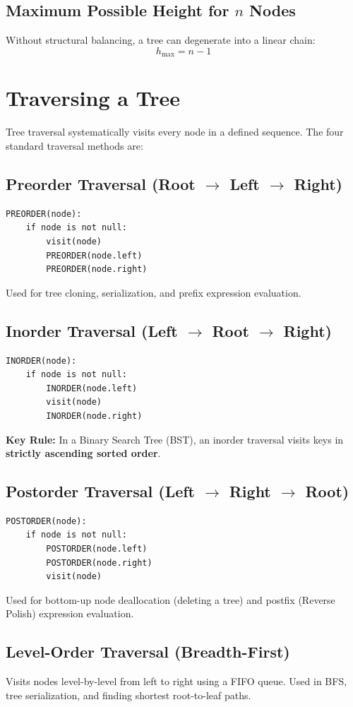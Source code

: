 \subsection{Maximum Possible Height for $n$ Nodes}
Without structural balancing, a tree can degenerate into a linear chain:
\[
\boxed{h_{\max} = n - 1}
\]

\section{Traversing a Tree}

Tree traversal systematically visits every node in a defined sequence. The four standard traversal methods are:

\subsection{Preorder Traversal (Root $\to$ Left $\to$ Right)}
\begin{lstlisting}[style=pseudocode]
PREORDER(node):
    if node is not null:
        visit(node)
        PREORDER(node.left)
        PREORDER(node.right)
\end{lstlisting}
Used for tree cloning, serialization, and prefix expression evaluation.

\subsection{Inorder Traversal (Left $\to$ Root $\to$ Right)}
\begin{lstlisting}[style=pseudocode]
INORDER(node):
    if node is not null:
        INORDER(node.left)
        visit(node)
        INORDER(node.right)
\end{lstlisting}
\textbf{Key Rule:} In a Binary Search Tree (BST), an inorder traversal visits keys in \textbf{strictly ascending sorted order}.

\subsection{Postorder Traversal (Left $\to$ Right $\to$ Root)}
\begin{lstlisting}[style=pseudocode]
POSTORDER(node):
    if node is not null:
        POSTORDER(node.left)
        POSTORDER(node.right)
        visit(node)
\end{lstlisting}
Used for bottom-up node deallocation (deleting a tree) and postfix (Reverse Polish) expression evaluation.

\subsection{Level-Order Traversal (Breadth-First)}
Visits nodes level-by-level from left to right using a FIFO queue. Used in BFS, tree serialization, and finding shortest root-to-leaf paths.

